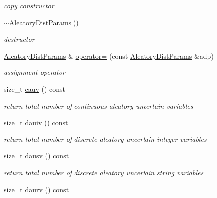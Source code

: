 \begin{DoxyCompactItemize}
\begin{DoxyCompactList}\small\item\em copy constructor \end{DoxyCompactList}\item 
\hyperlink{classPecos_1_1AleatoryDistParams_a643a2343b3190ce735699aca613f2639}{$\sim$\+Aleatory\+Dist\+Params} ()\label{classPecos_1_1AleatoryDistParams_a643a2343b3190ce735699aca613f2639}

\begin{DoxyCompactList}\small\item\em destructor \end{DoxyCompactList}\item 
\hyperlink{classPecos_1_1AleatoryDistParams}{Aleatory\+Dist\+Params} \& \hyperlink{classPecos_1_1AleatoryDistParams_a355a548cde94ace84d56082ed33f2cb6}{operator=} (const \hyperlink{classPecos_1_1AleatoryDistParams}{Aleatory\+Dist\+Params} \&adp)\label{classPecos_1_1AleatoryDistParams_a355a548cde94ace84d56082ed33f2cb6}

\begin{DoxyCompactList}\small\item\em assignment operator \end{DoxyCompactList}\item 
size\+\_\+t \hyperlink{classPecos_1_1AleatoryDistParams_a51753ce61d745d7d121b1bf947c413f0}{cauv} () const \label{classPecos_1_1AleatoryDistParams_a51753ce61d745d7d121b1bf947c413f0}

\begin{DoxyCompactList}\small\item\em return total number of continuous aleatory uncertain variables \end{DoxyCompactList}\item 
size\+\_\+t \hyperlink{classPecos_1_1AleatoryDistParams_abda05896057c789396e961a8565ff804}{dauiv} () const \label{classPecos_1_1AleatoryDistParams_abda05896057c789396e961a8565ff804}

\begin{DoxyCompactList}\small\item\em return total number of discrete aleatory uncertain integer variables \end{DoxyCompactList}\item 
size\+\_\+t \hyperlink{classPecos_1_1AleatoryDistParams_af077da258311c781dd0126ae2599020a}{dausv} () const \label{classPecos_1_1AleatoryDistParams_af077da258311c781dd0126ae2599020a}

\begin{DoxyCompactList}\small\item\em return total number of discrete aleatory uncertain string variables \end{DoxyCompactList}\item 
size\+\_\+t \hyperlink{classPecos_1_1AleatoryDistParams_a0ad70092b0a5dcabc82d6255dce3c625}{daurv} () const \label{classPecos_1_1AleatoryDistParams_a0ad70092b0a5dcabc82d6255dce3c625}


\end{DoxyCompactItemize}
